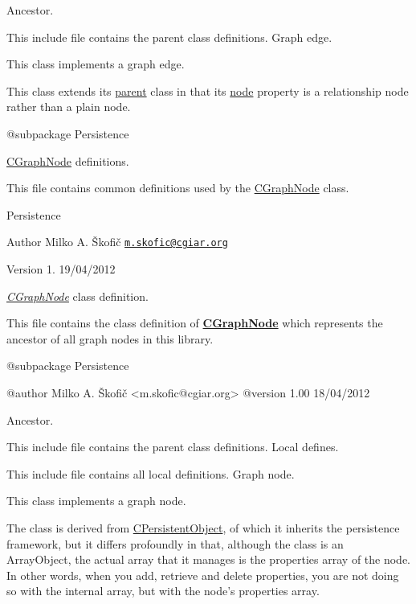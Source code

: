 Ancestor.

This include file contains the parent class definitions. Graph edge.

This class implements a graph edge.

This class extends its \hyperlink{class_c_graph_node}{parent} class in that its \hyperlink{}{node} property is a relationship node rather than a plain node.

\begin{DoxyVerb} @subpackage        Persistence\end{DoxyVerb}


\hyperlink{class_c_graph_node}{C\-Graph\-Node} definitions.

This file contains common definitions used by the \hyperlink{class_c_graph_node}{C\-Graph\-Node} class.

Persistence

\begin{DoxyAuthor}{Author}
Milko A. Škofič \href{mailto:m.skofic@cgiar.org}{\tt m.\-skofic@cgiar.\-org} 
\end{DoxyAuthor}
\begin{DoxyVersion}{Version}
1. 19/04/2012
\end{DoxyVersion}
{\itshape \hyperlink{class_c_graph_node}{C\-Graph\-Node}} class definition.

This file contains the class definition of {\bfseries \hyperlink{class_c_graph_node}{C\-Graph\-Node}} which represents the ancestor of all graph nodes in this library.

\begin{DoxyVerb} @subpackage        Persistence

 @author            Milko A. Škofič <m.skofic@cgiar.org>
 @version   1.00 18/04/2012\end{DoxyVerb}


Ancestor.

This include file contains the parent class definitions. Local defines.

This include file contains all local definitions. Graph node.

This class implements a graph node.

The class is derived from \hyperlink{class_c_persistent_object}{C\-Persistent\-Object}, of which it inherits the persistence framework, but it differs profoundly in that, although the class is an Array\-Object, the actual array that it manages is the properties array of the node. In other words, when you add, retrieve and delete properties, you are not doing so with the internal array, but with the node's properties array.

